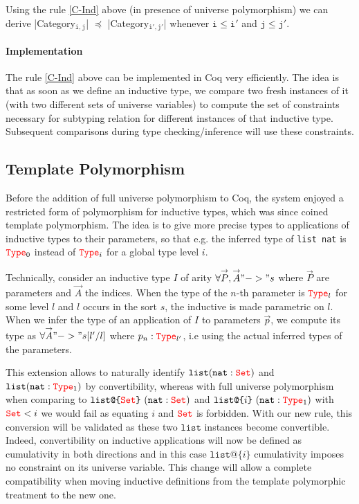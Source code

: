 \documentclass{easychair}
\newcommand{\Type}[1]{{\color{red} \mathtt{Type}}_{#1}}
\newcommand{\Set}{{\color{red} \mathtt{Set}}}
\begin{document}
Using the rule \ref{C-Ind} above (in presence of universe polymorphism)
we can derive
\Coqe|Category$_{\mathtt{i, j}}$| $\preceq$ \Coqe|Category$_{\mathtt{i', j'}}$|
whenever $\mathtt{i \le i'}$ and $\mathtt{j \le j'}$.

\paragraph{Implementation}
The rule \ref{C-Ind} above can be implemented in Coq very efficiently.
The idea is that as soon as we define an inductive type, we compare
two fresh instances of it (with two different sets of universe
variables) to compute the set of constraints necessary for subtyping
relation for different instances of that inductive type. Subsequent
comparisons during type checking/inference will use these constraints.


\def\vec#1{\overset{\rightarrow}{#1}}
\def\clist{\texttt{list}}
\def\nat{\texttt{nat}}
\def\ulist#1{\texttt{list@\{}#1\texttt{\}}}
\subsection*{Template Polymorphism}

Before the addition of full universe polymorphism to Coq, the system
enjoyed a restricted form of polymorphism for inductive types, which was
since coined template polymorphism. The idea is to give more precise
types to applications of inductive types to their parameters, so that
e.g. the inferred type of \texttt{list nat} is $\Type{0}$ instead of
$\Type{i}$ for a global type level $i$.

Technically, consider an inductive type $I$ of arity
$\forall \vec{P}, \vec{A} "->" s$ where $\vec{P}$ are parameters and
$\vec{A}$ the indices.  When the type of the $n$-th parameter is
$\Type{l}$ for some level $l$ and $l$ occurs in the sort $s$, the
inductive is made parametric on $l$. When we infer the type of an
application of $I$ to parameters $\vec{p}$, we compute its type as
$\forall \vec{A} "->" s[l'/l]$ where $p_n : \Type{l'}$, i.e using the
actual inferred types of the parameters.

This extension allows to naturally identify $\clist (\nat : \Set)$ and
$\clist (\nat : \Type{1})$ by convertibility, whereas with full universe
polymorphism when comparing to $\ulist{\Set}~(\nat : \Set)$ and
$\ulist{i}~ (\nat : \Type{1})$ with $\Set < i$ we would fail as equating
$i$ and $\Set$ is forbidden. With our new rule, this conversion will be
validated as these two $\texttt{list}$ instances become convertible.
Indeed, convertibility on inductive applications will now be defined as
cumulativity in both directions and in this case $\ulist{i}$
cumulativity imposes no constraint on its universe variable. This change
will allow a complete compatibility when moving inductive definitions
from the template polymorphic treatment to the new one.
\end{document}
